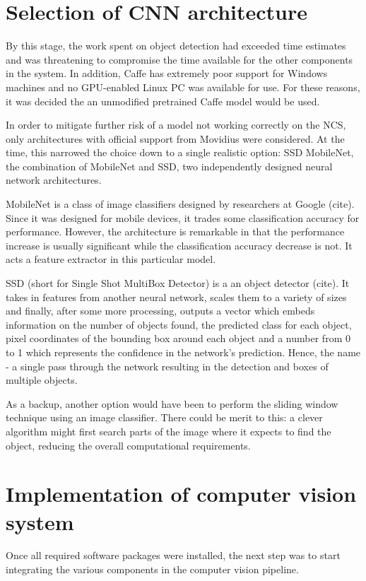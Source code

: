 \section{Selection of CNN architecture}
By this stage, the work spent on object detection had exceeded time estimates and was threatening to compromise the time available for the other components in the system. In addition, Caffe has extremely poor support for Windows machines and no GPU-enabled Linux PC was available for use. For these reasons, it was decided the an unmodified pretrained Caffe model would be used.

In order to mitigate further risk of a model not working correctly on the NCS, only architectures with official support from Movidius were considered. At the time, this narrowed the choice down to a single realistic option: SSD MobileNet, the combination of MobileNet and SSD, two independently designed neural network architectures.

MobileNet is a class of image classifiers designed by researchers at Google {\color{red} (cite)}. Since it was designed for mobile devices, it trades some classification accuracy for performance. However, the architecture is remarkable in that the performance increase is usually significant while the classification accuracy decrease is not. It acts a feature extractor in this particular model.

SSD (short for Single Shot MultiBox Detector) is a an object detector {\color{red} (cite)}. It takes in features from another neural network, scales them to a variety of sizes and finally, after some more processing, outputs a vector which embeds information on the number of objects found, the predicted class for each object, pixel coordinates of the bounding box around each object and a number from 0 to 1 which represents the confidence in the network's prediction. Hence, the name - a single pass through the network resulting in the detection and boxes of multiple objects.

As a backup, another option would have been to perform the sliding window technique using an image classifier. There could be merit to this: a clever algorithm might first search parts of the image where it expects to find the object, reducing the overall computational requirements.


\section{Implementation of computer vision system}
Once all required software packages were installed, the next step was to start integrating the various components in the computer vision pipeline.


